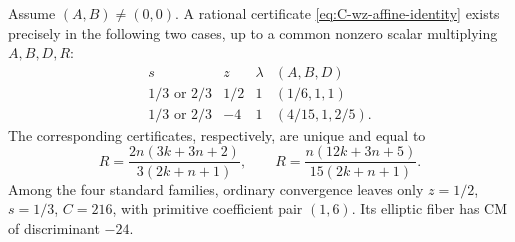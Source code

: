 \begin{theorem}
\label{thm:C-wz-affine}
Assume $(A,B)\ne(0,0)$.  A rational certificate
\eqref{eq:C-wz-affine-identity} exists precisely in the following two
cases, up to a common nonzero scalar multiplying $A,B,D,R$:
\[
\begin{array}{c|c|c|c}
 s&z&\lambda&(A,B,D)\\\hline
 1/3\text{ or }2/3&1/2&1&(1/6,1,1)\\
 1/3\text{ or }2/3&-4&1&(4/15,1,2/5).
\end{array}
\]
The corresponding certificates, respectively, are unique and equal to
\[
 R=\frac{2n(3k+3n+2)}{3(2k+n+1)},\qquad
 R=\frac{n(12k+3n+5)}{15(2k+n+1)}.
\]
Among the four standard families, ordinary convergence leaves only
$z=1/2$, $s=1/3$, $C=216$, with primitive coefficient pair $(1,6)$.
Its elliptic fiber has CM of discriminant $-24$.
\end{theorem}
